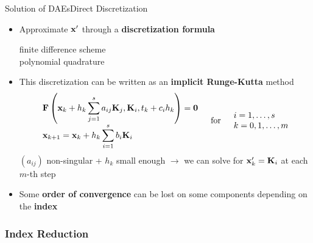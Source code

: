 \begin{frame}{Solution of \aclp{DAE}}{Direct Discretization}
  \begin{itemize}[<+->]
    \item Approximate $\mathbf{x}^\prime$ through a \textbf{discretization formula} \\
    \begin{small}
      \qquad finite difference scheme \\
      \qquad polynomial quadrature
    \end{small}
    \item This discretization can be written as an \textbf{implicit Runge-Kutta} method
    \begin{equation*}
      \begin{array}{l}
        \mathbf{F}\left(\mathbf{x}_{k} + h_k\displaystyle\sum_{j=1}^{s}a_{ij} \mathbf{K}_j, \mathbf{K}_i, t_{k} + c_i h_k\right) = \mathbf{0} \\[0.5em]
        \mathbf{x}_{k+1} = \mathbf{x}_{k} + h_k\displaystyle\sum_{i=1}^{s} b_i \mathbf{K}_i
      \end{array}
      \quad \text{for} \quad
      \begin{array}{l}
        i = 1, \dots, s \\
        k = 0, 1, \dots, m
      \end{array}
    \end{equation*}
    $(a_{ij})$ non-singular + $h_k$ small enough $\rightarrow$ we can solve for $\mathbf{x}^\prime_k = \mathbf{K}_i$ at each $m$-th step
    \item[\textcolor{mycolor3}{\faExclamationTriangle}] Some \textbf{order of convergence} can be lost on some components depending on the \textcolor{mycolor2!95!black}{\textbf{index}}
  \end{itemize}
\end{frame}

\subsubsection{Index Reduction}


